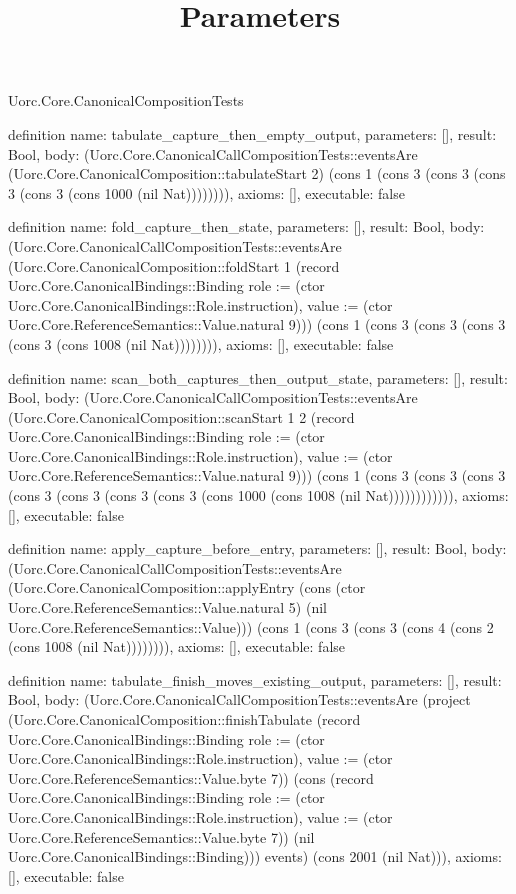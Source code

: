 \begin{lexlean}{Uorc.Core.CanonicalCompositionTests}
\title{Parameters}
\begin{semanticmodule}
definition{
  name: tabulate_capture_then_empty_output,
  parameters: [],
  result: Bool,
  body: (Uorc.Core.CanonicalCallCompositionTests::eventsAre (Uorc.Core.CanonicalComposition::tabulateStart 2) (cons 1 (cons 3 (cons 3 (cons 3 (cons 3 (cons 1000 (nil Nat)))))))),
  axioms: [],
  executable: false
}

definition{
  name: fold_capture_then_state,
  parameters: [],
  result: Bool,
  body: (Uorc.Core.CanonicalCallCompositionTests::eventsAre (Uorc.Core.CanonicalComposition::foldStart 1 (record Uorc.Core.CanonicalBindings::Binding {role := (ctor Uorc.Core.CanonicalBindings::Role.instruction), value := (ctor Uorc.Core.ReferenceSemantics::Value.natural 9)})) (cons 1 (cons 3 (cons 3 (cons 3 (cons 3 (cons 1008 (nil Nat)))))))),
  axioms: [],
  executable: false
}

definition{
  name: scan_both_captures_then_output_state,
  parameters: [],
  result: Bool,
  body: (Uorc.Core.CanonicalCallCompositionTests::eventsAre (Uorc.Core.CanonicalComposition::scanStart 1 2 (record Uorc.Core.CanonicalBindings::Binding {role := (ctor Uorc.Core.CanonicalBindings::Role.instruction), value := (ctor Uorc.Core.ReferenceSemantics::Value.natural 9)})) (cons 1 (cons 3 (cons 3 (cons 3 (cons 3 (cons 3 (cons 3 (cons 3 (cons 1000 (cons 1008 (nil Nat)))))))))))),
  axioms: [],
  executable: false
}

definition{
  name: apply_capture_before_entry,
  parameters: [],
  result: Bool,
  body: (Uorc.Core.CanonicalCallCompositionTests::eventsAre (Uorc.Core.CanonicalComposition::applyEntry (cons (ctor Uorc.Core.ReferenceSemantics::Value.natural 5) (nil Uorc.Core.ReferenceSemantics::Value))) (cons 1 (cons 3 (cons 3 (cons 4 (cons 2 (cons 1008 (nil Nat)))))))),
  axioms: [],
  executable: false
}

definition{
  name: tabulate_finish_moves_existing_output,
  parameters: [],
  result: Bool,
  body: (Uorc.Core.CanonicalCallCompositionTests::eventsAre (project (Uorc.Core.CanonicalComposition::finishTabulate (record Uorc.Core.CanonicalBindings::Binding {role := (ctor Uorc.Core.CanonicalBindings::Role.instruction), value := (ctor Uorc.Core.ReferenceSemantics::Value.byte 7)}) (cons (record Uorc.Core.CanonicalBindings::Binding {role := (ctor Uorc.Core.CanonicalBindings::Role.instruction), value := (ctor Uorc.Core.ReferenceSemantics::Value.byte 7)}) (nil Uorc.Core.CanonicalBindings::Binding))) events) (cons 2001 (nil Nat))),
  axioms: [],
  executable: false
}


\end{semanticmodule}
\end{lexlean}
